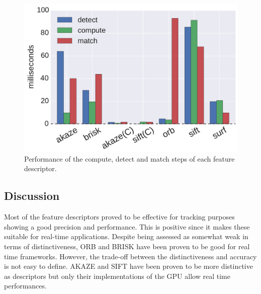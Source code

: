 \begin{figure}[!htb]
	\includegraphics[width=0.95\linewidth]{imgs/performances.pdf}
\vspace{-2.5mm}	
\caption{Performance of the compute, detect and match steps of each feature descriptor.}
\label{fig:speed_b}
\end{figure}


\subsection{Discussion}

Most of the feature descriptors proved to be effective for tracking purposes showing a good precision and performance. This is positive since it makes these suitable for real-time applications. Despite being assessed as somewhat weak in terms of distinctiveness, ORB and BRISK have been proven to be good for real time frameworks. 
However, the trade-off between the distinctiveness and accuracy is not easy to define.
AKAZE and SIFT have been proven to be more distinctive as descriptors but only their implementations of the GPU allow real time performances. 


